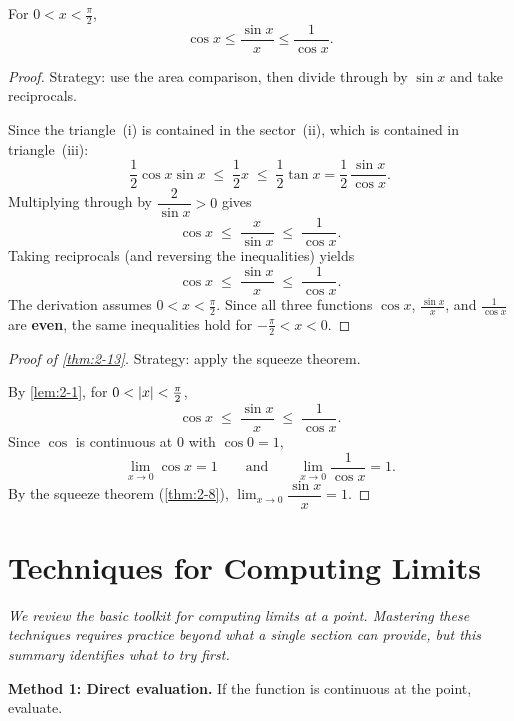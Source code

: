 \begin{lemma}
\label{lem:2-1}
For $0 < x < \frac{\pi}{2}$,
\[
  \cos x \leq \dfrac{\sin x}{x} \leq \dfrac{1}{\cos x}.
\]
\end{lemma}

\begin{proof}
Strategy: use the area comparison, then divide through by $\sin x$ and take reciprocals.

Since the triangle~(i) is contained in the sector~(ii), which is contained in triangle~(iii):
\[
  \frac{1}{2}\cos x \sin x \;\leq\; \frac{1}{2}x \;\leq\; \frac{1}{2}\tan x = \frac{1}{2}\,\dfrac{\sin x}{\cos x}.
\]
Multiplying through by $\dfrac{2}{\sin x} > 0$ gives
\[
  \cos x \;\leq\; \dfrac{x}{\sin x} \;\leq\; \dfrac{1}{\cos x}.
\]
Taking reciprocals (and reversing the inequalities) yields
\[
  \cos x \;\leq\; \dfrac{\sin x}{x} \;\leq\; \dfrac{1}{\cos x}.
\]
The derivation assumes $0 < x < \frac{\pi}{2}$.  Since all three functions $\cos x$, $\frac{\sin x}{x}$, and $\frac{1}{\cos x}$ are \textbf{even}, the same inequalities hold for $-\frac{\pi}{2} < x < 0$.
\end{proof}

\begin{proof}[Proof of \cref{thm:2-13}]
Strategy: apply the squeeze theorem.

By \cref{lem:2-1}, for $0 < \left\lvert x \right\rvert < \frac{\pi}{2}$,
\[
  \cos x \;\leq\; \dfrac{\sin x}{x} \;\leq\; \dfrac{1}{\cos x}.
\]
Since $\cos$ is continuous at $0$ with $\cos 0 = 1$,
\[
  \lim_{x \to 0} \cos x = 1 \qquad\text{and}\qquad \lim_{x \to 0} \dfrac{1}{\cos x} = 1.
\]
By the squeeze theorem (\cref{thm:2-8}), $\displaystyle\lim_{x \to 0} \dfrac{\sin x}{x} = 1$.
\end{proof}

\section{Techniques for Computing Limits}
\label{sec:2.19}

\textit{We review the basic toolkit for computing limits at a point.  Mastering these techniques requires practice beyond what a single section can provide, but this summary identifies what to try first.}

\textbf{Method 1: Direct evaluation.}  If the function is continuous at the point, evaluate.

